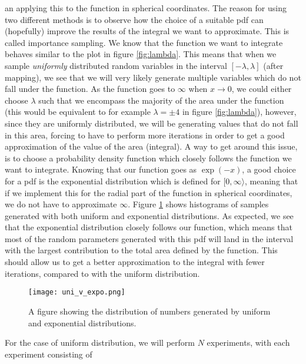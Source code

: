\documentclass[a4paper,10pt,english]{article}
\begin{document}
an applying this to the function in spherical coordinates. The reason for using two different methods is to observe how the choice of a suitable pdf can (hopefully) improve the results of the integral we want to approximate. This is called importance sampling. We know that the function we want to integrate behaves similar to the plot in figure \ref{fig:lambda}. This means that when we sample \textit{uniformly} distributed random variables in the interval $[-\lambda, \lambda]$ (after mapping), we see that we will very likely generate multiple variables which do not fall under the function. As the function goes to $\infty$ when $x \rightarrow 0$, we could either choose $\lambda$ such that we encompass the majority of the area under the function (this would be equivalent to for example $\lambda = \pm 4$ in figure \ref{fig:lambda}), however, since they are uniformly distributed, we will be generating values that do not fall in this area, forcing to have to perform more iterations in order to get a good approximation of the value of the area (integral). A way to get around this issue, is to choose a probability density function which closely follows the function we want to integrate. Knowing that our function goes as $\exp(-x)$, a good choice for a pdf is the exponential distribution which is defined for $[0, \infty \rangle$, meaning that if we implement this for the radial part of the function in spherical coordinates, we do not have to approximate $\infty$. Figure \ref{fig:uni_v_expo} shows histograms of samples generated with both uniform and exponential distributions. As expected, we see that the exponential distribution closely follows our function, which means that most of the random parameters generated with this pdf will land in the interval with the largest contribution to the total area defined by the function.  This should allow us to get a better approximation to the integral with fewer iterations, compared to with the uniform distribution.

\begin{figure}
    \centering
    \texttt{[image: uni\_v\_expo.png]}
    \caption{A figure showing the distribution of numbers generated by uniform and exponential distributions.}
    \label{fig:uni_v_expo}
\end{figure}


For the case of uniform distribution, we will perform $N$ experiments, with each experiment consisting of
\end{document}

